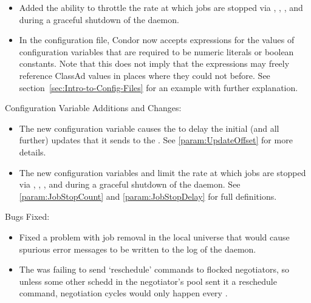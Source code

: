 \begin{itemize}
\item Added the ability to throttle the rate at which jobs are
stopped via , , ,
and during a graceful shutdown of the  daemon.

\item In the configuration file, Condor now accepts expressions for
the values of configuration variables that are required to be 
numeric literals or boolean constants.  
Note that this does not imply that the
expressions may freely reference ClassAd values in places where they
could not before.  
See section~\ref{sec:Intro-to-Config-Files} for an example with
further explanation.

\end{itemize}

\noindent Configuration Variable Additions and Changes:

\begin{itemize}

\item The new configuration variable  
  causes the  to
  delay the initial (and all further) updates that it sends to the
  .  See \ref{param:UpdateOffset} for more details.

\item The new configuration variables
   and 
  limit the rate at which jobs are stopped via ,
  , , and during a graceful shutdown of
  the  daemon.
  See \ref{param:JobStopCount} and \ref{param:JobStopDelay} 
  for full definitions.

\end{itemize}

\noindent Bugs Fixed:

\begin{itemize}

\item Fixed a problem with job removal in the local universe that 
  would cause spurious error messages to be written to the log of the
   daemon.

\item The  was failing to send `reschedule' commands to
flocked negotiators, so unless some other schedd in the negotiator's
pool sent it a reschedule command, negotiation cycles would only
happen every .

\end{itemize}

